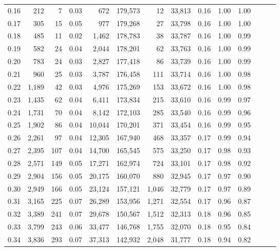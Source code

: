 \begin{tabular}{rrrrrrrrrrrrrr}
0.16 &    212 &      7 &  0.03 &      672 &  179,573 &      12 &  33,813 &  0.16 &  1.00 &      1.00 \\
0.17 &    305 &     15 &  0.05 &      977 &  179,268 &      27 &  33,798 &  0.16 &  1.00 &      1.00 \\
0.18 &    485 &     11 &  0.02 &    1,462 &  178,783 &      38 &  33,787 &  0.16 &  1.00 &      0.99 \\
0.19 &    582 &     24 &  0.04 &    2,044 &  178,201 &      62 &  33,763 &  0.16 &  1.00 &      0.99 \\
0.20 &    783 &     24 &  0.03 &    2,827 &  177,418 &      86 &  33,739 &  0.16 &  1.00 &      0.99 \\
0.21 &    960 &     25 &  0.03 &    3,787 &  176,458 &     111 &  33,714 &  0.16 &  1.00 &      0.98 \\
0.22 &  1,189 &     42 &  0.03 &    4,976 &  175,269 &     153 &  33,672 &  0.16 &  1.00 &      0.98 \\
0.23 &  1,435 &     62 &  0.04 &    6,411 &  173,834 &     215 &  33,610 &  0.16 &  0.99 &      0.97 \\
0.24 &  1,731 &     70 &  0.04 &    8,142 &  172,103 &     285 &  33,540 &  0.16 &  0.99 &      0.96 \\
0.25 &  1,902 &     86 &  0.04 &   10,044 &  170,201 &     371 &  33,454 &  0.16 &  0.99 &      0.95 \\
0.26 &  2,261 &     97 &  0.04 &   12,305 &  167,940 &     468 &  33,357 &  0.17 &  0.99 &      0.94 \\
0.27 &  2,395 &    107 &  0.04 &   14,700 &  165,545 &     575 &  33,250 &  0.17 &  0.98 &      0.93 \\
0.28 &  2,571 &    149 &  0.05 &   17,271 &  162,974 &     724 &  33,101 &  0.17 &  0.98 &      0.92 \\
0.29 &  2,904 &    156 &  0.05 &   20,175 &  160,070 &     880 &  32,945 &  0.17 &  0.97 &      0.90 \\
0.30 &  2,949 &    166 &  0.05 &   23,124 &  157,121 &   1,046 &  32,779 &  0.17 &  0.97 &      0.89 \\
0.31 &  3,165 &    225 &  0.07 &   26,289 &  153,956 &   1,271 &  32,554 &  0.17 &  0.96 &      0.87 \\
0.32 &  3,389 &    241 &  0.07 &   29,678 &  150,567 &   1,512 &  32,313 &  0.18 &  0.96 &      0.85 \\
0.33 &  3,799 &    243 &  0.06 &   33,477 &  146,768 &   1,755 &  32,070 &  0.18 &  0.95 &      0.84 \\
0.34 &  3,836 &    293 &  0.07 &   37,313 &  142,932 &   2,048 &  31,777 &  0.18 &  0.94 &      0.82 \\

\end{tabular}
